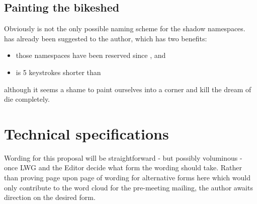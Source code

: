 \section{Painting the bikeshed}
Obviously  is not the only possible naming scheme for the
shadow namespaces.  has already been suggested to the author,
which has two benefits:
\begin{itemize}
\item those namespaces have been reserved since , and
\item {} is 5 keystrokes shorter than
\end{itemize}
although it seems a shame to paint ourselves into a corner and kill the dream
of  die completely.


\chapter{Technical specifications}
Wording for this proposal will be straightforward - but possibly voluminous -
once LWG and the Editor decide what form the wording should take. Rather than
proving page upon page of wording for alternative forms here which would only
contribute to the word cloud for the pre-meeting mailing, the author awaits
direction on the desired form.
